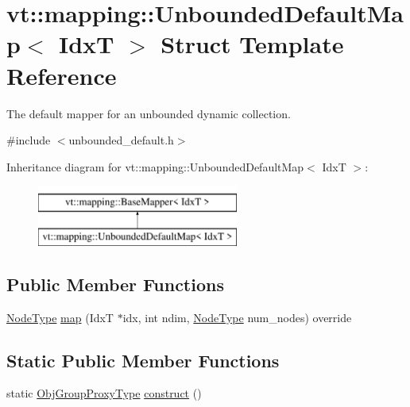 \hypertarget{structvt_1_1mapping_1_1_unbounded_default_map}{}\section{vt\+:\+:mapping\+:\+:Unbounded\+Default\+Map$<$ IdxT $>$ Struct Template Reference}
\label{structvt_1_1mapping_1_1_unbounded_default_map}


The default mapper for an unbounded dynamic collection.  




{\ttfamily \#include $<$unbounded\+\_\+default.\+h$>$}

Inheritance diagram for vt\+:\+:mapping\+:\+:Unbounded\+Default\+Map$<$ IdxT $>$\+:\begin{figure}[H]
\begin{center}
\leavevmode
\includegraphics[height=2.000000cm]{structvt_1_1mapping_1_1_unbounded_default_map}
\end{center}
\end{figure}
\subsection*{Public Member Functions}
\begin{DoxyCompactItemize}
\item 
\hyperlink{namespacevt_a866da9d0efc19c0a1ce79e9e492f47e2}{Node\+Type} \hyperlink{structvt_1_1mapping_1_1_unbounded_default_map_a8617e6a789985a7140d09a8be6bc3a47}{map} (IdxT $\ast$idx, int ndim, \hyperlink{namespacevt_a866da9d0efc19c0a1ce79e9e492f47e2}{Node\+Type} num\+\_\+nodes) override
\end{DoxyCompactItemize}
\subsection*{Static Public Member Functions}
\begin{DoxyCompactItemize}
\item 
static \hyperlink{namespacevt_ad7cae989df485fccca57f0792a880a8e}{Obj\+Group\+Proxy\+Type} \hyperlink{structvt_1_1mapping_1_1_unbounded_default_map_aeb005e2e45f45fcd17548ee10e66862b}{construct} ()
\end{DoxyCompactItemize}
